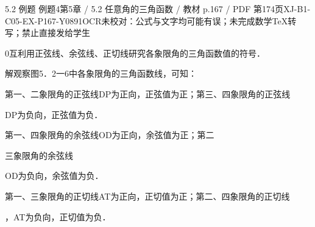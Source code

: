 \begin{bankitem}{5.2 例题 例题4}{第5章 / 5.2 任意角的三角函数 / 教材 p.167 / PDF 第174页}{XJ-B1-C05-EX-P167-Y0891}{OCR未校对：公式与文字均可能有误；未完成数学TeX转写；禁止直接发给学生}
\begin{ocrdraft}
\par
0互利用正弦线、余弦线、正切线研究各象限角的三角函数值的符号．
\par
解观察图5．2一6中各象限角的三角函数线，可知：
\par
第一、二象限角的正弦线DP为正向，正弦值为正；第三、四象限角的正弦线
\par
DP为负向，正弦值为负．
\par
第一、四象限角的余弦线OD为正向，余弦值为正；第二
\par
三象限角的余弦线
\par
OD为负向，余弦值为负．
\par
第一、三象限角的正切线AT为正向，正切值为正；第二、四象限角的正切线
\par
，AT为负向，正切值为负．
\end{ocrdraft}
\end{bankitem}
